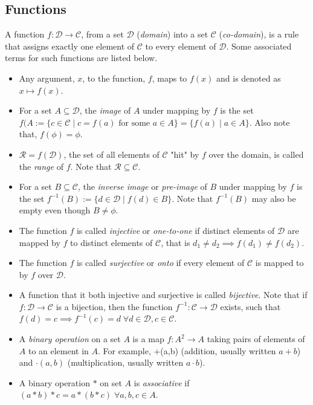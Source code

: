\documentclass[10pt]{article}
\begin{document}
\subsection{Functions}
A function $f: \mathcal{D}\to\mathcal{C}$, from a set $\mathcal{D}$ (\textit{domain}) into a set $\mathcal{C}$ (\textit{co-domain}), is a rule that assigns exactly one element of $\mathcal{C}$ to every element of $\mathcal{D}$. Some associated terms for such functions are listed below.
\begin{itemize}
    \item Any argument, $x$, to the function, $f$, maps to $f(x)$ and is denoted as $x \mapsto f(x)$.
    \item For a set $A\subseteq\mathcal{D}$, the \textit{image} of $A$ under mapping by $f$ is the set $f(A := \{c\in\mathcal{C}\mid c = f(a) \text{ for some } a\in A\} = \{f(a)\mid a\in A\}$. Also note that, $f(\phi) = \phi$.
    \item $\mathcal{R} = f(\mathcal{D})$, the set of all elements of $\mathcal{C}$ "hit" by $f$ over the domain, is called the \textit{range} of $f$. Note that $\mathcal{R}\subseteq\mathcal{C}$.
    \item For a set $B\subseteq\mathcal{C}$, the \textit{inverse image} or \textit{pre-image} of $B$ under mapping by $f$ is the set $f^{-1}(B) := \{d\in\mathcal{D}\mid f(d)\in B\}$. Note that $f^{-1}(B)$ may also be empty even though $B\neq \phi$.
    \item The function $f$ is called \textit{injective} or \textit{one-to-one} if distinct elements of $\mathcal{D}$ are mapped by $f$ to distinct elements of $\mathcal{C}$, that is $d_1\neq d_2 \implies f(d_1)\neq f(d_2)$.
    \item The function $f$ is called \textit{surjective} or \textit{onto} if every element of $\mathcal{C}$ is mapped to by $f$ over $\mathcal{D}$.
    \item A function that it both injective and surjective is called \textit{bijective}. Note that if $f:\mathcal{D}\to\mathcal{C}$ is a bijection, then the function $f^{-1}:\mathcal{C}\to\mathcal{D}$ exists, such that $f(d) = c \implies f^{-1}(c) = d \; \forall d\in\mathcal{D}, c\in\mathcal{C}$.
    \item A \textit{binary operation} on a set $A$ is a map $f:A^2\to A$ taking pairs of elements of $A$ to an element in $A$. For example, +(a,b) (addition, usually written $a+b$) and $\cdot(a,b)$ (multiplication, usually written $a\cdot b$).
    \item A binary operation $*$ on set $A$ is \textit{associative} if $(a*b)*c = a*(b*c) \; \forall a,b,c \in A$.

\end{itemize}
\end{document}
